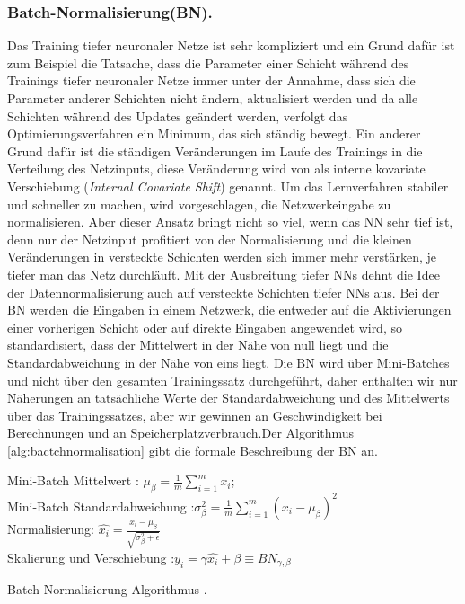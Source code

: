 \documentclass[12pt,a4paper]{scrartcl}
\numberwithin{equation}{section}
\begin{document}
\subsubsection{Batch-Normalisierung(BN).}\label{Batch-Normalisierung}
Das Training tiefer neuronaler Netze ist sehr kompliziert und ein Grund dafür ist zum Beispiel die Tatsache, dass die Parameter einer Schicht während des Trainings tiefer neuronaler Netze immer unter der Annahme, dass sich die Parameter anderer Schichten nicht ändern, aktualisiert werden und da alle Schichten während des Updates geändert werden, verfolgt das Optimierungsverfahren ein Minimum, das sich ständig bewegt. Ein anderer Grund dafür ist die ständigen Veränderungen im Laufe des Trainings in die Verteilung des Netzinputs, diese Veränderung wird von \cite{bactchnormalisation} als interne kovariate Verschiebung (\textit{Internal Covariate Shift}) genannt. Um das Lernverfahren stabiler und schneller zu machen, wird vorgeschlagen, die Netzwerkeingabe zu normalisieren. Aber dieser Ansatz bringt nicht so viel, wenn das \ac{NN} sehr tief ist, denn nur der Netzinput profitiert von der Normalisierung und die kleinen Veränderungen in versteckte Schichten werden sich immer mehr verstärken, je tiefer man das Netz durchläuft. Mit der Ausbreitung tiefer \acsp{NN} dehnt die Idee der Datennormalisierung auch auf versteckte Schichten tiefer \acsp{NN} aus. Bei der BN werden die Eingaben in einem Netzwerk, die entweder auf die Aktivierungen einer vorherigen Schicht oder auf direkte Eingaben angewendet wird, so standardisiert, dass der Mittelwert in der Nähe von null liegt und die Standardabweichung in der Nähe von eins liegt. Die BN wird über Mini-Batches und nicht über den gesamten Trainingssatz durchgeführt, daher enthalten wir nur Näherungen an tatsächliche Werte der Standardabweichung und des Mittelwerts über das Trainingssatzes, aber wir gewinnen an Geschwindigkeit bei Berechnungen und an Speicherplatzverbrauch.Der Algorithmus \ref{alg:bactchnormalisation} gibt die formale Beschreibung der BN  an.

\begin{algorithm}
	\DontPrintSemicolon

 	Mini-Batch Mittelwert  :  $ \mu_\beta=\frac{1}{m}\sum_{i = 1}^{m}x_i $;\\
	Mini-Batch Standardabweichung :$  \sigma_\beta^2=\frac{1}{m}\sum_{i = 1}^{m}(x_i- \mu_\beta)^2 $\\
	Normalisierung:  $ \widehat{x_i} = \frac{x_i - \mu_\beta}{\sqrt{\sigma_\beta^2 + \epsilon}} $\\
	Skalierung und Verschiebung :$ {y_i} = \gamma\widehat{x_i} + \beta \equiv BN_{\gamma, \beta} $
	\caption{Batch-Normalisierung-Algorithmus \cite{bactchnormalisation}.}
	\label{alg:bactchnormalisation}
\end{algorithm}
\end{document}
